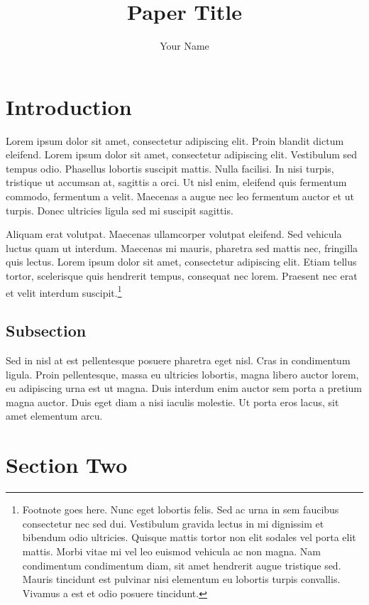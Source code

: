 \documentclass{carver-cyberlaw}
\title{Paper Title}
\author{Your Name}
\begin{document}
\maketitle

\section{Introduction}

Lorem ipsum dolor sit amet, consectetur adipiscing elit. Proin blandit dictum 
eleifend. Lorem ipsum dolor sit amet, consectetur adipiscing elit. Vestibulum 
sed tempus odio. Phasellus lobortis suscipit mattis. Nulla facilisi. In nisi 
turpis, tristique ut accumsan at, sagittis a orci. Ut nisl enim, eleifend quis 
fermentum commodo, fermentum a velit. Maecenas a augue nec leo fermentum 
auctor et ut turpis. Donec ultricies ligula sed mi suscipit sagittis.

Aliquam erat volutpat. Maecenas ullamcorper volutpat eleifend. Sed vehicula 
luctus quam ut interdum. Maecenas mi mauris, pharetra sed mattis nec, 
fringilla quis lectus. Lorem ipsum dolor sit amet, consectetur adipiscing 
elit. Etiam tellus tortor, scelerisque quis hendrerit tempus, consequat nec 
lorem. Praesent nec erat et velit interdum suscipit.\footnote{Footnote goes 
here. Nunc eget lobortis felis. Sed ac urna in sem faucibus consectetur nec 
sed dui. Vestibulum gravida lectus in mi dignissim et bibendum odio ultricies. 
Quisque mattis tortor non elit sodales vel porta elit mattis. Morbi vitae mi 
vel leo euismod vehicula ac non magna. Nam condimentum condimentum diam, sit 
amet hendrerit augue tristique sed. Mauris tincidunt est pulvinar nisi 
elementum eu lobortis turpis convallis. Vivamus a est et odio posuere 
tincidunt.}

\subsection{Subsection}

Sed in nisl at est pellentesque posuere pharetra eget nisl. Cras in 
condimentum ligula. Proin pellentesque, massa eu ultricies lobortis, magna 
libero auctor lorem, eu adipiscing urna est ut magna. Duis interdum enim 
auctor sem porta a pretium magna auctor. Duis eget diam a nisi iaculis 
molestie. Ut porta eros lacus, sit amet elementum arcu.

\section{Section Two}
\end{document}
